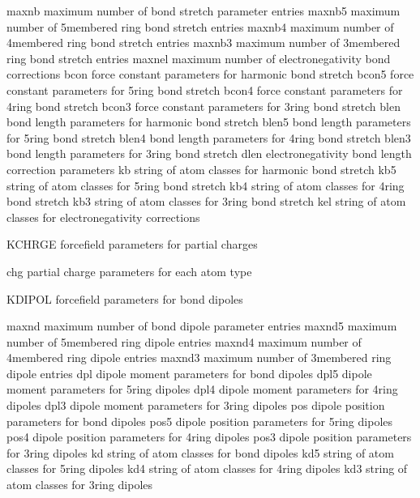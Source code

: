 \documentclass[letterpaper,11pt,english]{sphinxmanual}
\begin{document}
maxnb   maximum number of bond stretch parameter entries
maxnb5  maximum number of 5\sphinxhyphen{}membered ring bond stretch entries
maxnb4  maximum number of 4\sphinxhyphen{}membered ring bond stretch entries
maxnb3  maximum number of 3\sphinxhyphen{}membered ring bond stretch entries
maxnel  maximum number of electronegativity bond corrections
bcon    force constant parameters for harmonic bond stretch
bcon5   force constant parameters for 5\sphinxhyphen{}ring bond stretch
bcon4   force constant parameters for 4\sphinxhyphen{}ring bond stretch
bcon3   force constant parameters for 3\sphinxhyphen{}ring bond stretch
blen    bond length parameters for harmonic bond stretch
blen5   bond length parameters for 5\sphinxhyphen{}ring bond stretch
blen4   bond length parameters for 4\sphinxhyphen{}ring bond stretch
blen3   bond length parameters for 3\sphinxhyphen{}ring bond stretch
dlen    electronegativity bond length correction parameters
kb      string of atom classes for harmonic bond stretch
kb5     string of atom classes for 5\sphinxhyphen{}ring bond stretch
kb4     string of atom classes for 4\sphinxhyphen{}ring bond stretch
kb3     string of atom classes for 3\sphinxhyphen{}ring bond stretch
kel     string of atom classes for electronegativity corrections

KCHRGE  forcefield parameters for partial charges

chg     partial charge parameters for each atom type

KDIPOL  forcefield parameters for bond dipoles

maxnd   maximum number of bond dipole parameter entries
maxnd5  maximum number of 5\sphinxhyphen{}membered ring dipole entries
maxnd4  maximum number of 4\sphinxhyphen{}membered ring dipole entries
maxnd3  maximum number of 3\sphinxhyphen{}membered ring dipole entries
dpl     dipole moment parameters for bond dipoles
dpl5    dipole moment parameters for 5\sphinxhyphen{}ring dipoles
dpl4    dipole moment parameters for 4\sphinxhyphen{}ring dipoles
dpl3    dipole moment parameters for 3\sphinxhyphen{}ring dipoles
pos     dipole position parameters for bond dipoles
pos5    dipole position parameters for 5\sphinxhyphen{}ring dipoles
pos4    dipole position parameters for 4\sphinxhyphen{}ring dipoles
pos3    dipole position parameters for 3\sphinxhyphen{}ring dipoles
kd      string of atom classes for bond dipoles
kd5     string of atom classes for 5\sphinxhyphen{}ring dipoles
kd4     string of atom classes for 4\sphinxhyphen{}ring dipoles
kd3     string of atom classes for 3\sphinxhyphen{}ring dipoles
\end{document}

